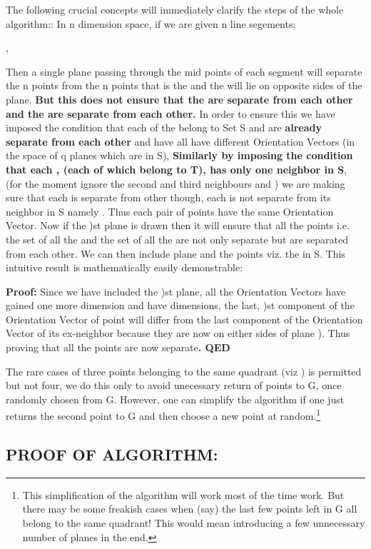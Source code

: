 \documentclass[english]{article}
\begin{document}
The following crucial concepts will immediately clarify the steps
of the whole algorithm:: In n dimension space, if we are given n line
segements;

,

Then a single plane passing through the mid points of each segment
will separate the n points  from the
n points  that is the  and
the  will lie on opposite sides of the plane. \textbf{But this
does not ensure that the  are separate from each other and the
 are separate from each other.} In order to ensure this we have
imposed the condition that each of the  belong to Set S and
are \textbf{already separate from each other }and have all have different
Orientation Vectors (in the space of q planes which are in S), \textbf{Similarly
by imposing the condition that each  , (each of which belong to
T), has only one neighbor in S}, (for the moment ignore the second
and third neighbours and ) we are making sure that each
 is separate from other  though, each  is not
separate from its neighbor in S namely . Thus each pair of
points  have the same Orientation Vector. Now if the
)st plane is drawn then it will ensure that all the  points
i.e. the set of all the  and the set of all the  are not
only separate but are separated from each other. We can then include
plane  and the  points viz. the  in S. This intuitive
result is mathematically easily demonstrable:\textbf{ }

\textbf{Proof:} Since we have included the )st plane, all the
Orientation Vectors have gained one more dimension and have 
dimensions, the last, )st component of the Orientation Vector
of point  will differ from the last component of the Orientation
Vector of its ex-neighbor  because they are now on either
sides of plane ). Thus proving that all the  points are
now separate\textbf{. QED}

The rare cases of three points belonging to the same quadrant (viz
 ) is permitted but not four, we do this only
to avoid unecessary return of points to G, once randomly chosen from
G. However, one can simplify the algorithm if one just returns the
second point to G and then choose a new point at random.\footnote{This simplification of the algorithm will work most of the time work.
But there may be some freakish cases when (say) the last few points
left in G all belong to the same quadrant! This would mean introducing
a few unnecessary number of planes in the end.}


\subsection{PROOF OF ALGORITHM:}
\end{document}
